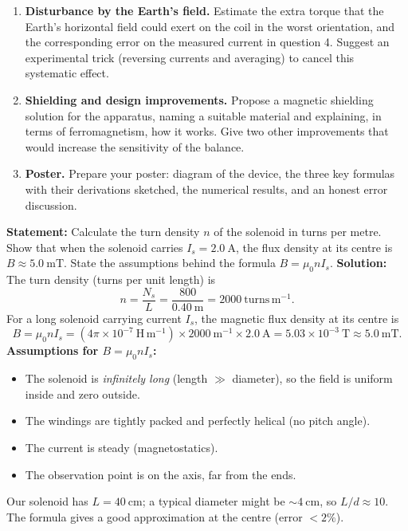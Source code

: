 \documentclass[11pt]{article}
\newcounter{popsec}
\newcounter{popsub}
\newcommand{\courssub}[1]{%
  \stepcounter{popsub}%
  \par\vspace{9pt}\noindent{\popxbold\fontsize{11.5}{13}\selectfont\color{popink}{\color{poporange}\thepopsec.\thepopsub}\hspace{6pt}#1}\par\nopagebreak\vspace{4pt}
}
\begin{document}
\begin{enumerate}
\item \textbf{Disturbance by the Earth's field.} Estimate the extra torque that the Earth's horizontal field could exert on the coil in the worst orientation, and the corresponding error on the measured current in question 4. Suggest an experimental trick (reversing currents and averaging) to cancel this systematic effect.

\item \textbf{Shielding and design improvements.} Propose a magnetic shielding solution for the apparatus, naming a suitable material and explaining, in terms of ferromagnetism, how it works. Give two other improvements that would increase the sensitivity of the balance.

\item \textbf{Poster.} Prepare your poster: diagram of the device, the three key formulas with their derivations sketched, the numerical results, and an honest error discussion.
\end{enumerate}

\courssub{Model Answers}

\begin{exoresolu}
\textbf{Statement:} Calculate the turn density $n$ of the solenoid in turns per metre. Show that when the solenoid carries $I_s = 2.0\ \mathrm{A}$, the flux density at its centre is $B \approx 5.0\ \mathrm{mT}$. State the assumptions behind the formula $B = \mu_0 n I_s$.
\tcblower
\textbf{Solution:}
The turn density (turns per unit length) is
\[
n = \frac{N_s}{L} = \frac{800}{0.40\ \mathrm{m}} = 2000\ \mathrm{turns\,m^{-1}}.
\]
For a long solenoid carrying current $I_s$, the magnetic flux density at its centre is
\[
B = \mu_0 n I_s = (4\pi \times 10^{-7}\ \mathrm{H\,m^{-1}}) \times 2000\ \mathrm{m^{-1}} \times 2.0\ \mathrm{A}
= 5.03 \times 10^{-3}\ \mathrm{T} \approx 5.0\ \mathrm{mT}.
\]
\textbf{Assumptions for $B = \mu_0 n I_s$:}
\begin{itemize}
\item The solenoid is \emph{infinitely long} (length $\gg$ diameter), so the field is uniform inside and zero outside.
\item The windings are tightly packed and perfectly helical (no pitch angle).
\item The current is steady (magnetostatics).
\item The observation point is on the axis, far from the ends.
\end{itemize}
Our solenoid has $L = 40\ \mathrm{cm}$; a typical diameter might be $\sim 4\ \mathrm{cm}$, so $L/d \approx 10$. The formula gives a good approximation at the centre (error $< 2\%$).
\end{exoresolu}
\end{document}
